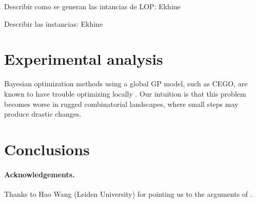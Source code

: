 \documentclass[runningheads]{llncs}
\begin{document}
Describir como se generan las intancias de LOP: Ekhine

Describir las instancias: Ekhine


\section{Experimental analysis}

Bayesian optimization methods using a global GP model, such as CEGO, are known
to have trouble optimizing locally \citep{EriPeaGar2019scalable}. Our
intuition is that this problem becomes worse in rugged combinatorial
landscapes, where small steps may produce drastic changes.

\section{Conclusions}

\paragraph*{Acknowledgements.}

Thanks to Hao Wang (Leiden University) for pointing us to the arguments of
\citet{EriPeaGar2019scalable}.




\renewcommand{\doi}[1]{doi:\hspace{.16667em plus .08333em}\discretionary{}{}{}\href{https://doi.org/#1}{\urlstyle{rm}\nolinkurl{#1}}}


\end{document}
